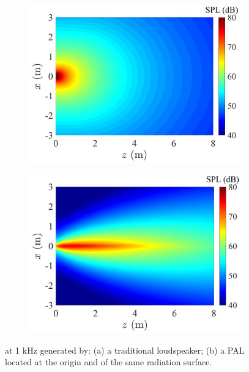 \begin{figure}[!htb]
    \centering
    \begin{subfigure}{0.47\textwidth}
        \centering
        \includegraphics[width=\textwidth]{fig/show_2D_audio1000_PistonSource_A_resize.jpg}
        \caption{}
    \end{subfigure}
    \begin{subfigure}{0.47\textwidth}
        \centering
        \includegraphics[width=\textwidth]{fig/show_2D_audio1000_ultra60e3_A_resize.jpg}
        \caption{}
    \end{subfigure}
    \caption{ at 1 kHz generated by: (a) a traditional loudspeaker; (b) a PAL located at the origin and of the same radiation surface.}
    \label{fig:pal_sound_field_compare_to_traditional}
\end{figure}

